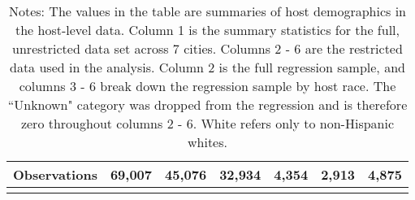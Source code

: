{\begin{longtable}{l*{6}{c}}
		
		\hline
		Observations    &69,007  & 45,076   &       32,934      &    4,354       &     2,913    &      4,875       \\
		\hline\hline
		\caption*{Notes: The values in the table are summaries of host demographics in the host-level data. Column 1 is the summary statistics for the full, unrestricted data set across 7 cities. Columns 2 - 6 are the restricted data used in the analysis. Column 2 is the full regression sample, and columns 3 - 6 break down the regression sample by host race. The ``Unknown" category was dropped from the regression and is therefore zero throughout columns 2 - 6. White refers only to non-Hispanic whites.}
		
	\end{longtable}
}


